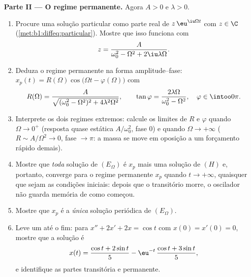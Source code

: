 \begin{problem}
\medskip
\noindent\textbf{Parte II --- O regime permanente.} Agora $A > 0$ e
$\lambda > 0$.
\begin{enumerate}
  \item Procure uma solução particular como parte real de
        $z\,\eu^{\iu\Omega t}$ com $z \in \C$
        (\cref{met:b1:diffeq:particular}). Mostre que isso funciona
        com
        \[
        z = \frac{A}{\omega_0^2 - \Omega^2 + 2\iu\lambda\Omega} .
        \]
  \item Deduza o regime permanente na forma amplitude--fase:
        $x_p(t) = R(\Omega)\cos\bigl(\Omega t -
        \varphi(\Omega)\bigr)$ com
        \[
        R(\Omega) = \frac{A}{\sqrt{(\omega_0^2 - \Omega^2)^2 +
        4\lambda^2\Omega^2}},
        \qquad
        \tan\varphi = \frac{2\lambda\Omega}{\omega_0^2 -
        \Omega^2},
        \quad \varphi \in \intoo0\pi .
        \]
  \item Interprete os dois regimes extremos: calcule os limites de
        $R$ e $\varphi$ quando $\Omega \to 0^+$ (resposta quase
        estática $A/\omega_0^2$, fase $0$) e quando $\Omega \to
        +\infty$ ($R \sim A/\Omega^2 \to 0$, fase $\to \pi$: a
        massa se move em oposição a um forçamento rápido demais).
  \item Mostre que \emph{toda} solução de $(E_\Omega)$ é $x_p$
        mais uma solução de $(H)$ e, portanto, converge para o
        regime permanente $x_p$ quando $t \to +\infty$, quaisquer que
        sejam as condições iniciais: depois que o transitório morre,
        o oscilador não guarda memória de como começou.
  \item Mostre que $x_p$ é a \emph{única} solução periódica de
        $(E_\Omega)$.
  \item Leve um  até o fim: para $x'' + 2x' + 2x =
        \cos t$ com $x(0) = x'(0) = 0$, mostre que a solução é
        \[
        x(t) = \frac{\cos t + 2\sin t}5
        - \eu^{-t}\,\frac{\cos t + 3\sin t}5 ,
        \]
        e identifique as partes transitória e permanente.
\end{enumerate}


\end{problem}
